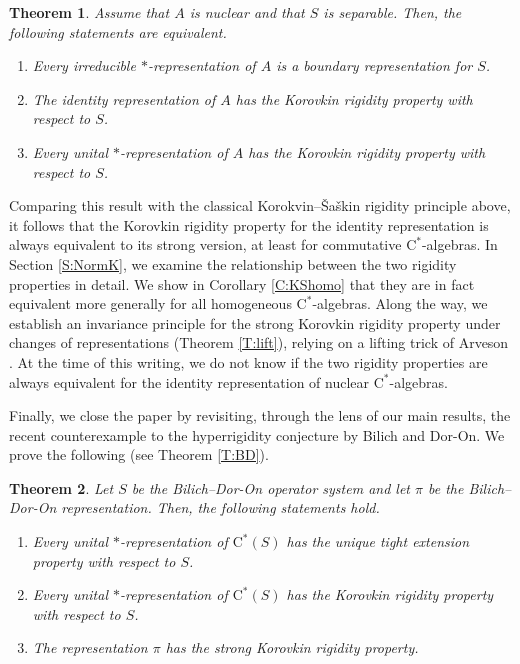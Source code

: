 \documentclass[10pt]{amsart}
\newcommand{\rC}{\mathrm{C}}
\newtheorem{theoremx}{Theorem}
\theoremstyle{definition}
\begin{document}
\begin{theoremx}\label{T:B}
Assume that $A$ is nuclear and that $S$ is separable. Then, the following statements are equivalent.
\begin{enumerate}[{\rm (i)}]
\item Every irreducible $*$-representation of $A$ is a boundary representation for $S$.
\item The identity representation of $A$ has the Korovkin rigidity property  with respect to $S$.
\item Every unital $*$-representation of $A$ has the Korovkin rigidity property with respect to $S$.
\end{enumerate}
\end{theoremx}

Comparing this result with the classical Korokvin--\v{S}a\v{s}kin rigidity principle above, it follows that the 
Korovkin rigidity property for the identity representation is always equivalent to its strong version, at least for commutative $\rC^*$-algebras.  In Section \ref{S:NormK}, we examine the relationship between the two rigidity properties in detail.  We show in Corollary \ref{C:KShomo} that they are in fact equivalent more generally for all homogeneous $\rC^*$-algebras. Along the way, we establish an invariance principle for the strong Korovkin rigidity property under changes of representations (Theorem \ref{T:lift}), relying on a lifting trick of Arveson \cite{arveson1977notes}.  At the time of this writing, we do not know if the two rigidity properties are always equivalent for the identity representation of nuclear $\rC^*$-algebras.

Finally, we close the paper by revisiting, through the lens of our main results, the recent counterexample to the hyperrigidity conjecture  by Bilich and Dor-On. We prove the following (see Theorem \ref{T:BD}).

\begin{theoremx}\label{T:C}
Let $S$ be the Bilich--Dor-On operator system and let $\pi$ be the Bilich--Dor-On representation. Then, the following statements hold.
\begin{enumerate}[\rm (i)]
\item Every unital $*$-representation of $\rC^*(S)$ has the unique tight extension property with respect to $S$.
\item Every unital $*$-representation of $\rC^*(S)$ has the  Korovkin rigidity property with respect to $S$.
\item The representation $\pi$ has the strong Korovkin rigidity property.
\end{enumerate}
\end{theoremx}
\end{document}

